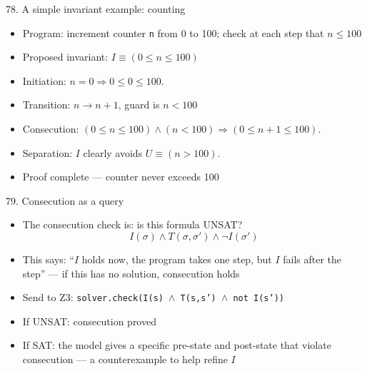 \documentclass[aspectratio=169]{beamer}
\begin{document}
\begin{frame}{78. A simple invariant example: counting}
\begin{itemize}
  \item Program: increment counter \texttt{n} from 0 to 100; check at each step that \(n \le 100\)
  \item Proposed invariant: \(I \equiv (0 \le n \le 100)\)
  \item Initiation: \(n = 0 \Rightarrow 0 \le 0 \le 100\). \checkmark
  \item Transition: \(n \to n+1\), guard is \(n < 100\)
  \item Consecution: \((0 \le n \le 100) \wedge (n < 100) \Rightarrow (0 \le n+1 \le 100)\). \checkmark
  \item Separation: \(I\) clearly avoids \(U \equiv (n > 100)\). \checkmark
  \item Proof complete --- counter never exceeds 100
\end{itemize}
\end{frame}

\begin{frame}{79. Consecution as a query}
\begin{itemize}
  \item The consecution check is: is this formula UNSAT?
  \[
  I(\sigma) \wedge T(\sigma, \sigma') \wedge \neg I(\sigma')
  \]
  \item This says: ``\(I\) holds now, the program takes one step, but \(I\) fails after the step'' ---
    if this has no solution, consecution holds
  \item Send to Z3: \texttt{solver.check(I(s) $\wedge$ T(s,s') $\wedge$ not I(s'))}
  \item If UNSAT: consecution proved
  \item If SAT: the model gives a specific pre-state and post-state that violate consecution --- a counterexample to help refine \(I\)
\end{itemize}
\end{frame}
\end{document}
